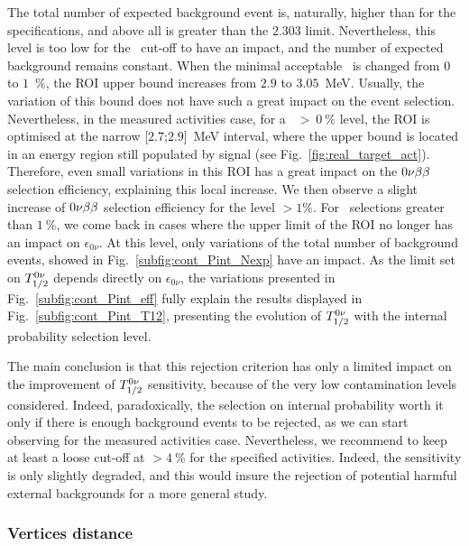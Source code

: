 The total number of expected background event is, naturally, higher than for the specifications, and above all is greater than the $2.303$ limit.
Nevertheless, this level is too low for the \Pint\ cut-off to have an impact, and the number of expected background remains constant.
When the minimal acceptable \Pint\ is changed from $0$ to $1$~\%, the ROI upper bound increases from $2.9$ to $3.05$~MeV.
Usually, the variation of this bound does not have such a great impact on the event selection.
Nevertheless, in the measured activities case, for a \Pint~$>~0~\%$ level, the ROI is optimised at the narrow [$2.7$;$2.9$]~MeV interval, where the upper bound is located in an energy region still populated by signal (see Fig.~\ref{fig:real_target_act}).
Therefore, even small variations in this ROI has a great impact on the $0\nu\beta\beta$ selection efficiency, explaining this local increase.
We then observe a slight increase of $0\nu\beta\beta$ selection efficiency for the level \Pint$>1\%$.
For \Pint\ selections greater than $1~\%$, we come back in cases where the upper limit of the ROI no longer has an impact on $\epsilon_{0\nu}$.
At this level, only variations of the total number of background events, showed in Fig.~\ref{subfig:cont_Pint_Nexp} have an impact.
As the limit set on $T_{1/2}^{0\nu}$ depends directly on $\epsilon_{0\nu}$, the variations presented in Fig.~\ref{subfig:cont_Pint_eff} fully explain the results displayed in Fig.~\ref{subfig:cont_Pint_T12}, presenting the evolution of $T_{1/2}^{0\nu}$ with the internal probability selection level.

The main conclusion is that this rejection criterion has only a limited impact on the improvement of $T_{1/2}^{0\nu}$ sensitivity, because of the very low contamination levels considered.
Indeed, paradoxically, the selection on internal probability worth it only if there is enough background events to be rejected, as we can start observing for the measured activities case.
Nevertheless, we recommend to keep at least a loose cut-off at \Pint$>4~\%$ for the specified activities.
Indeed, the sensitivity is only slightly degraded, and this would insure the rejection of potential harmful external backgrounds for a more general study.


\subsubsection{Vertices distance}

